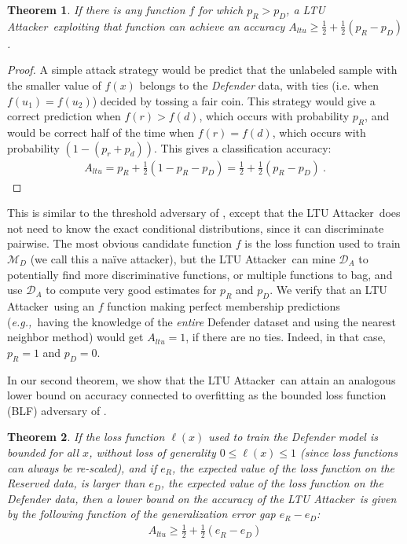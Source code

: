 \documentclass[letterpaper]{article}
\newcommand{\eg}{{\em e.g.,~}}
\newcommand{\oracle}{LTU Attacker~}
\newtheorem{theorem}{Theorem}
\begin{document}

\begin{theorem}\label{thm:pairwise}
If there is any function $f$ for which $p_R  > p_D$, a \oracle exploiting that function can achieve an accuracy $A_{ltu} \ge \frac{1}{2} + \frac{1}{2}(p_R - p_D)$.
\end{theorem}

\begin{proof}
A simple attack strategy would be predict that the unlabeled sample with the smaller value of $f(x)$ belongs to the {\em Defender} data, with ties (i.e. when $f(u_1)=f(u_2)$) decided by tossing a fair coin. This strategy would give a correct prediction when $f(r)>f(d)$, which occurs with probability $p_R$, and would be correct half of the time when $f(r)=f(d)$, which occurs with probability $(1-(p_r+p_d))$. This gives a classification accuracy:
\begin{align}
A_{ltu} = p_R + \frac{1}{2}(1- p_R- p_D)= \frac{1}{2} + \frac{1}{2}(p_R - p_D)~.
\end{align}
\end{proof}

This is similar to the threshold adversary of \cite{yeom2018privacy}, except that the \oracle does not need to know the exact conditional distributions, since it can discriminate pairwise. The most obvious candidate function $f$ is the loss function used to train $\mathcal{M}_D$ (we call this a na\"ive attacker), but the \oracle can mine $\mathcal{D}_A$ to potentially find more discriminative functions, or multiple functions to bag, and use $\mathcal{D}_A$ to compute very good estimates for $p_R$ and $p_D$. We verify that an \oracle using an $f$ function making perfect membership predictions (\eg having the knowledge of the {\em entire} Defender dataset and using the nearest neighbor method) would get $A_{ltu} = 1$, if there are no ties. Indeed, in that case, $p_R=1$ and $p_D=0$.



In our second theorem, we show that the \oracle can attain an analogous lower bound on accuracy connected to overfitting as the bounded loss function (BLF) adversary of \cite{yeom2018privacy}.
\begin{theorem}\label{thm:blf}
If the loss function $\ell(x)$ used to train the Defender model is bounded for all $x$, without loss of generality $0 \le \ell(x) \le 1$ (since loss functions can always be re-scaled), and if $e_R$, the expected value of the loss function on the Reserved data, is larger than $e_D$, the expected value of the loss function on the Defender data, then a lower bound on the accuracy of the \oracle is given by the following function of the generalization error gap $e^{}_R - e^{}_D$:
\begin{align}
A_{ltu} \ge \frac{1}{2} + \frac{1}{2} (e^{}_R - e^{}_D)
\end{align}
\end{theorem}
\end{document}
